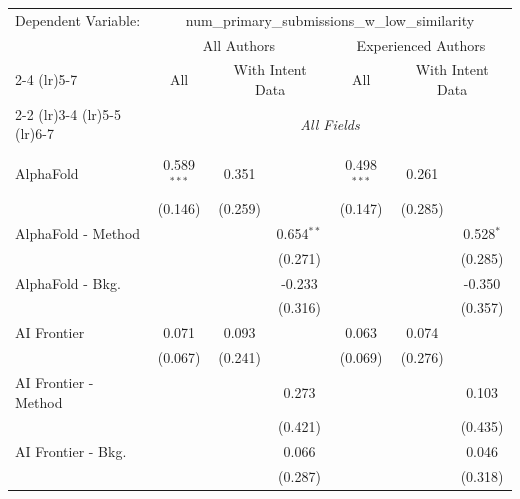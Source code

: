 \begingroup
\centering
\begin{tabular}{lcccccc}
   \tabularnewline \midrule \midrule
   Dependent Variable: & \multicolumn{6}{c}{num\_primary\_submissions\_w\_low\_similarity}\\
 & \multicolumn{3}{c}{All Authors} & \multicolumn{3}{c}{Experienced Authors} \\
\cmidrule(lr){2-4} \cmidrule(lr){5-7}
 & \multicolumn{1}{c}{All} & \multicolumn{2}{c}{With Intent Data} & \multicolumn{1}{c}{All} & \multicolumn{2}{c}{With Intent Data} \\
\cmidrule(lr){2-2} \cmidrule(lr){3-4} \cmidrule(lr){5-5} \cmidrule(lr){6-7}
 & \multicolumn{6}{c}{\textit{All Fields}} \\ \\
   AlphaFold            & 0.589$^{***}$ & 0.351         &              & 0.498$^{***}$ & 0.261          &   \\   
                        & (0.146)       & (0.259)       &              & (0.147)       & (0.285)        &   \\   
   AlphaFold - Method   &               &               & 0.654$^{**}$ &               &                & 0.528$^{*}$\\   
                        &               &               & (0.271)      &               &                & (0.285)\\   
   AlphaFold - Bkg.     &               &               & -0.233       &               &                & -0.350\\   
                        &               &               & (0.316)      &               &                & (0.357)\\   
   AI Frontier          & 0.071         & 0.093         &              & 0.063         & 0.074          &   \\   
                        & (0.067)       & (0.241)       &              & (0.069)       & (0.276)        &   \\   
   AI Frontier - Method &               &               & 0.273        &               &                & 0.103\\   
                        &               &               & (0.421)      &               &                & (0.435)\\   
   AI Frontier - Bkg.   &               &               & 0.066        &               &                & 0.046\\   
                        &               &               & (0.287)      &               &                & (0.318)\\   

\end{tabular}
